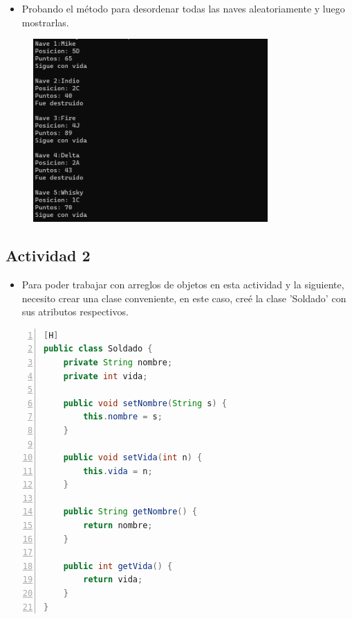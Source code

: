 \documentclass{article}
\begin{document}
	\begin{itemize}
		\item Probando el método para desordenar todas las naves aleatoriamente y luego mostrarlas.
	\end{itemize}
	\begin{figure}[H]
		\centering
	\includegraphics[width=0.8\textwidth,keepaspectratio]{img/captura7.png}
	\end{figure}
	
	\subsection{Actividad 2}
	\begin{itemize}
		\item Para poder trabajar con arreglos de objetos en esta actividad y la siguiente, necesito crear una clase conveniente, en este caso, creé la clase 'Soldado' con sus atributos respectivos.
	\end{itemize}
	
	\begin{lstlisting}[language=java,caption={Clase Soldado}, numbers=left][H]
public class Soldado {
    private String nombre;
    private int vida;

    public void setNombre(String s) {
        this.nombre = s;
    }

    public void setVida(int n) {
        this.vida = n;
    }

    public String getNombre() {
        return nombre;
    }

    public int getVida() {
        return vida;
    }
}
	\end{lstlisting}
	
\end{document}
